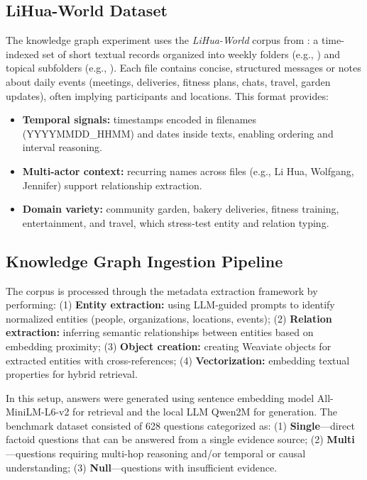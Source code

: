 \subsection{LiHua-World Dataset}
\label{subsec:LiHua-World}
The knowledge graph experiment uses the \emph{LiHua-World} corpus from \cite{fan2025minirag}: a time-indexed set of short textual records organized into weekly folders (e.g., ) and topical subfolders (e.g., ). Each file contains concise, structured messages or notes about daily events (meetings, deliveries, fitness plans, chats, travel, garden updates), often implying participants and locations. This format provides:
\begin{itemize}
    \item \textbf{Temporal signals:} timestamps encoded in filenames (YYYYMMDD\_HHMM) and dates inside texts, enabling ordering and interval reasoning.
    \item \textbf{Multi-actor context:} recurring names across files (e.g., Li Hua, Wolfgang, Jennifer) support relationship extraction.
    \item \textbf{Domain variety:} community garden, bakery deliveries, fitness training, entertainment, and travel, which stress-test entity and relation typing.
\end{itemize}

\subsection{Knowledge Graph Ingestion Pipeline}

The corpus is processed through the metadata extraction framework by performing: (1) \textbf{Entity extraction:} using LLM-guided prompts to identify normalized entities (people, organizations, locations, events); (2) \textbf{Relation extraction:} inferring semantic relationships between entities based on embedding proximity; (3) \textbf{Object creation:} creating Weaviate objects for extracted entities with cross-references; (4) \textbf{Vectorization:} embedding textual properties for hybrid retrieval.


In this setup, answers were generated using sentence embedding model All-MiniLM-L6-v2 for retrieval and the local LLM Qwen2M for generation. The benchmark dataset consisted of 628 questions categorized as: (1) \textbf{Single}—direct factoid questions that can be answered from a single evidence source; (2) \textbf{Multi}—questions requiring multi-hop reasoning and/or temporal or causal understanding; (3) \textbf{Null}—questions with insufficient evidence.

